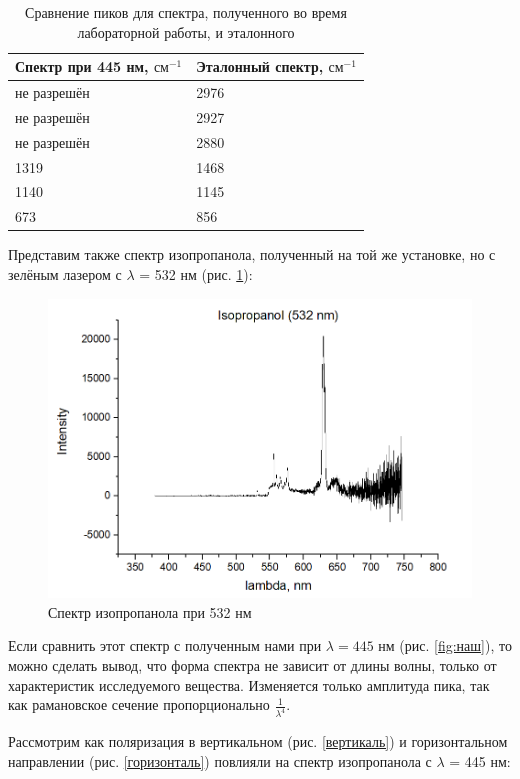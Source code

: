 \documentclass{article}
\begin{document}
\begin{table}[h!]
\centering
\begin{tabular}{|l|l|}
\hline
Спектр при 445 нм, $\text{см}^{-1}$ & Эталонный спектр, $\text{см}^{-1}$ \\ \hline
не разрешён                    & 2976             \\ \hline
не разрешён                    & 2927             \\ \hline
не разрешён                     & 2880             \\ \hline
    1319          & 1468             \\ \hline
    1140          & 1145             \\ \hline
    673         & 856              \\ \hline
\end{tabular}
\caption{Сравнение пиков для спектра, полученного во время лабораторной работы, и эталонного}
\label{tab:my-table}
\end{table}
\par Представим также спектр изопропанола, полученный на той же установке, но с зелёным лазером с $\lambda$ = 532 нм (рис. \ref{532nm}):
\begin{figure}[h!]
\centering
    \includegraphics[width=0.8\linewidth]{Images/iso 532.png}
    \caption{Спектр изопропанола при 532 нм}
    \label{532nm}
\end{figure}
\par Если сравнить этот спектр с полученным нами при $\lambda = 445$ нм (рис. \ref{fig:наш}), то можно сделать вывод, что форма спектра не зависит от длины волны, только от характеристик исследуемого вещества. Изменяется только амплитуда пика, так как рамановское сечение пропорционально $\frac{1}{\lambda ^4}$.
\par Рассмотрим как поляризация в вертикальном (рис. \ref{вертикаль}) и горизонтальном направлении (рис. \ref{горизонталь}) повлияли на спектр изопропанола с $\lambda$ = 445 нм:
\end{document}
